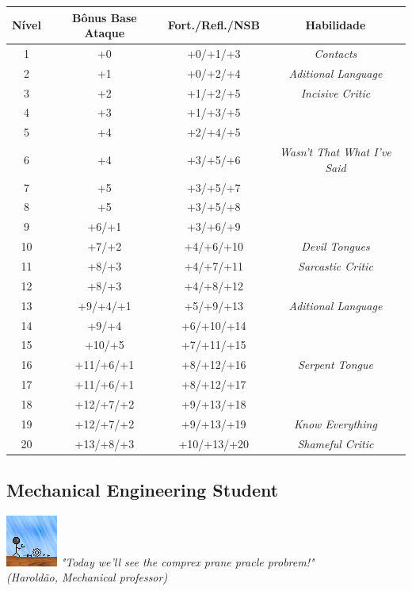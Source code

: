 \documentclass[ letterpaper,12pt]{article}
\begin{document}
\begin{center} \begin{tabular}{|c||c|c|c|}
\hline
{\bf Nível}&{\bf Bônus Base Ataque}&{\bf Fort./Refl./NSB}&{\bf Habilidade}\\
\hline
1&+0&+0/+1/+3&{\it Contacts}\\
\hline
2&+1&+0/+2/+4&{\it Aditional Language}\\
\hline
3&+2&+1/+2/+5&{\it Incisive Critic}\\
\hline
4&+3&+1/+3/+5&\\
\hline
5&+4&+2/+4/+5&\\
\hline
6&+4&+3/+5/+6&{\it Wasn't That What I've Said}\\
\hline
7&+5&+3/+5/+7&\\
\hline
8&+5&+3/+5/+8&\\
\hline
9&+6/+1&+3/+6/+9&\\
\hline
10&+7/+2&+4/+6/+10&{\it Devil Tongues}\\
\hline
11&+8/+3&+4/+7/+11&{\it Sarcastic Critic}\\
\hline
12&+8/+3&+4/+8/+12&\\
\hline
13&+9/+4/+1&+5/+9/+13&{\it Aditional Language}\\
\hline
14&+9/+4&+6/+10/+14&\\
\hline
15&+10/+5&+7/+11/+15&\\
\hline
16&+11/+6/+1&+8/+12/+16&{\it Serpent Tongue}\\
\hline
17&+11/+6/+1&+8/+12/+17&\\
\hline
18&+12/+7/+2&+9/+13/+18&\\
\hline
19&+12/+7/+2&+9/+13/+19&{\it Know Everything}\\
\hline
20&+13/+8/+3&+10/+13/+20&{\it Shameful Critic}\\
\hline
\end{tabular} \end{center}

\subsection{Mechanical Engineering Student}
\includegraphics{../data/classes/Img/engmecanica.png}
{\it "Today we'll see the comprex prane pracle probrem!"\\ (Haroldão, Mechanical professor)}\\
\end{document}
